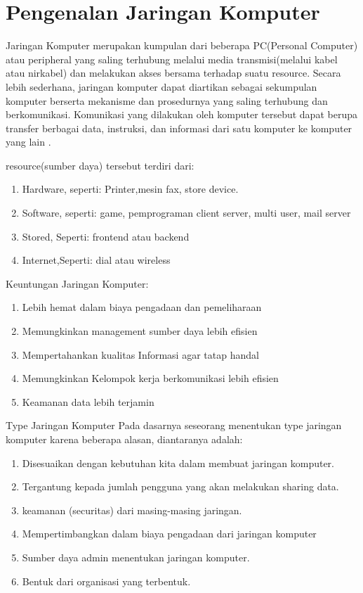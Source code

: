 \section{Pengenalan Jaringan Komputer}
 Jaringan Komputer merupakan kumpulan dari beberapa PC(Personal Computer) atau peripheral yang saling terhubung melalui media transmisi(melalui kabel atau nirkabel) dan melakukan akses bersama  terhadap suatu resource.
 Secara lebih sederhana, jaringan komputer dapat diartikan sebagai sekumpulan komputer berserta mekanisme dan prosedurnya yang saling terhubung dan berkomunikasi.  Komunikasi yang dilakukan oleh komputer tersebut dapat berupa transfer berbagai data, instruksi, dan informasi dari satu komputer ke komputer yang lain \cite{irawan2012analisis}.

 resource(sumber daya) tersebut terdiri dari:
 \begin{enumerate}
   \item Hardware, seperti: Printer,mesin fax, store device.
   \item Software, seperti: game, pemprograman client server, multi user, mail server
   \item Stored, Seperti: frontend atau backend
   \item Internet,Seperti: dial atau wireless
 \end{enumerate}

Keuntungan Jaringan Komputer:
\begin{enumerate}
  \item Lebih hemat dalam biaya pengadaan dan pemeliharaan
  \item Memungkinkan management sumber daya lebih efisien
  \item Mempertahankan kualitas Informasi agar tatap handal
  \item Memungkinkan Kelompok kerja berkomunikasi lebih efisien
  \item Keamanan data lebih terjamin
\end{enumerate}

Type Jaringan Komputer
 Pada dasarnya seseorang menentukan type jaringan komputer karena beberapa alasan, diantaranya adalah:
 \begin{enumerate}
   \item Disesuaikan dengan kebutuhan kita dalam membuat jaringan komputer.
   \item Tergantung kepada jumlah pengguna yang akan melakukan sharing data.
   \item keamanan (securitas) dari masing-masing jaringan.
   \item Mempertimbangkan dalam biaya pengadaan dari jaringan komputer
   \item Sumber daya admin menentukan jaringan komputer.
   \item Bentuk dari organisasi yang terbentuk.
 \end{enumerate}

